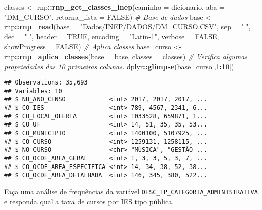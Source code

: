 \documentclass[12pt,]{style/krantz}
\makeatletter
\newenvironment{Shaded}{\begin{snugshade}}{\end{snugshade}}
\newcommand{\KeywordTok}[1]{\textcolor[rgb]{0.13,0.29,0.53}{\textbf{#1}}}
\newcommand{\DataTypeTok}[1]{\textcolor[rgb]{0.13,0.29,0.53}{#1}}
\newcommand{\DecValTok}[1]{\textcolor[rgb]{0.00,0.00,0.81}{#1}}
\newcommand{\StringTok}[1]{\textcolor[rgb]{0.31,0.60,0.02}{#1}}
\newcommand{\CommentTok}[1]{\textcolor[rgb]{0.56,0.35,0.01}{\textit{#1}}}
\newcommand{\OtherTok}[1]{\textcolor[rgb]{0.56,0.35,0.01}{#1}}
\newcommand{\OperatorTok}[1]{\textcolor[rgb]{0.81,0.36,0.00}{\textbf{#1}}}
\newcommand{\NormalTok}[1]{#1}
\newenvironment{kframe}{%
\medskip{}
\setlength{\fboxsep}{.8em}
 \def\at@end@of@kframe{}%
 \ifinner\ifhmode%
  \def\at@end@of@kframe{\end{minipage}}%
  \begin{minipage}{\columnwidth}%
 \fi\fi%
 \def\FrameCommand##1{\hskip\@totalleftmargin \hskip-\fboxsep
 \colorbox{shadecolor}{##1}\hskip-\fboxsep
     \hskip-\linewidth \hskip-\@totalleftmargin \hskip\columnwidth}%
 \MakeFramed {\advance\hsize-\width
   \@totalleftmargin\z@ \linewidth\hsize
   \@setminipage}}%
 {\par\unskip\endMakeFramed%
 \at@end@of@kframe}
\renewenvironment{Shaded}{\begin{kframe}}{\end{kframe}}
\theoremstyle{definition}
\theoremstyle{definition}
\theoremstyle{definition}
\theoremstyle{remark}
\let\BeginKnitrBlock\begin \let\EndKnitrBlock\end
\makeatother
\begin{document}
\begin{Shaded}
\begin{Highlighting}[]
\NormalTok{classes <-}\StringTok{ }\NormalTok{rnp}\OperatorTok{::}\KeywordTok{rnp_get_classes_inep}\NormalTok{(}\DataTypeTok{caminho =}\NormalTok{ dicionario, }
                                     \DataTypeTok{aba =} \StringTok{"DM_CURSO"}\NormalTok{, }
                                     \DataTypeTok{retorna_lista =} \OtherTok{FALSE}\NormalTok{)}
\CommentTok{# Base de dados  }
\NormalTok{base <-}\StringTok{ }\NormalTok{rnp}\OperatorTok{::}\KeywordTok{rnp_read}\NormalTok{(}\DataTypeTok{base =} \StringTok{"Dados/INEP/DADOS/DM_CURSO.CSV"}\NormalTok{,}
                      \DataTypeTok{sep =} \StringTok{"|"}\NormalTok{, }
                      \DataTypeTok{dec =} \StringTok{"."}\NormalTok{, }
                      \DataTypeTok{header =} \OtherTok{TRUE}\NormalTok{, }
                      \DataTypeTok{encoding =} \StringTok{"Latin-1"}\NormalTok{,}
                      \DataTypeTok{verbose =} \OtherTok{FALSE}\NormalTok{, }
                      \DataTypeTok{showProgress =} \OtherTok{FALSE}\NormalTok{)}
\CommentTok{# Aplica classes}
\NormalTok{base_curso <-}\StringTok{ }\NormalTok{rnp}\OperatorTok{::}\KeywordTok{rnp_aplica_classes}\NormalTok{(}\DataTypeTok{base =}\NormalTok{ base, }\DataTypeTok{classes =}\NormalTok{ classes)}
\CommentTok{# Verifica algumas propriedades das 10 primeiras colunas.}
\NormalTok{dplyr}\OperatorTok{::}\KeywordTok{glimpse}\NormalTok{(base_curso[,}\DecValTok{1}\OperatorTok{:}\DecValTok{10}\NormalTok{])}
\end{Highlighting}
\end{Shaded}

\begin{verbatim}
## Observations: 35,693
## Variables: 10
## $ NU_ANO_CENSO            <int> 2017, 2017, 2017, ...
## $ CO_IES                  <int> 789, 4567, 2341, 6...
## $ CO_LOCAL_OFERTA         <int> 1033528, 659871, 1...
## $ CO_UF                   <int> 14, 51, 35, 35, 53...
## $ CO_MUNICIPIO            <int> 1400100, 5107925, ...
## $ CO_CURSO                <int> 1259131, 1258115, ...
## $ NO_CURSO                <chr> "MÚSICA", "GESTÃO ...
## $ CO_OCDE_AREA_GERAL      <int> 1, 3, 3, 5, 3, 7, ...
## $ CO_OCDE_AREA_ESPECIFICA <int> 14, 34, 38, 52, 38...
## $ CO_OCDE_AREA_DETALHADA  <int> 146, 345, 380, 522...
\end{verbatim}

\BeginKnitrBlock{exercise}
\protect\hypertarget{exr:unnamed-chunk-37}{}{\label{exr:unnamed-chunk-37}
}Faça uma análise de frequências da variável
\texttt{DESC\_TP\_CATEGORIA\_ADMINISTRATIVA} e responda qual a taxa de
cursos por IES tipo pública.
\EndKnitrBlock{exercise}
\end{document}
